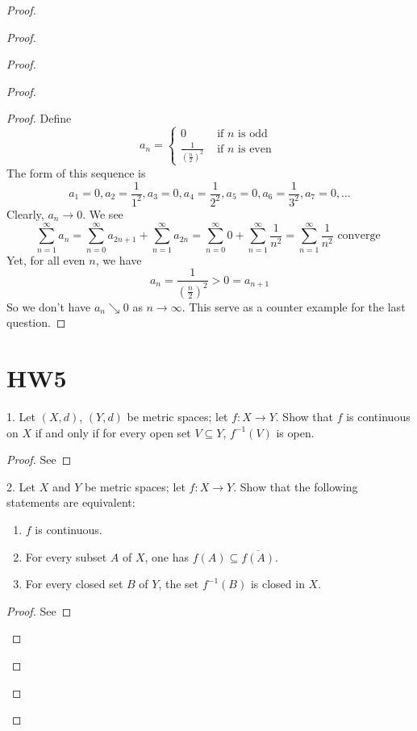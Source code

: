 \documentclass{report}
\begin{document}
\begin{proof}
\begin{proof}
\begin{proof}
\begin{proof}
\begin{proof}
Define
\begin{equation*}
a_n=\begin{cases}
 0& \text{ if $n$ is odd }\\
 \frac{1}{(\frac{n}{2})^2}& \text{ if $n$ is even }
\end{cases}
\end{equation*}
The form of this sequence is
\begin{equation*}
a_1=0,a_2=\frac{1}{1^2},a_3=0,a_4=\frac{1}{2^2},a_5=0,a_6=\frac{1}{3^2},a_7=0,\dots 
\end{equation*}
Clearly, $a_n\to 0$. We see
\begin{equation*}
\sum_{n=1}^\infty a_n=\sum_{n=0}^\infty a_{2n+1}+\sum_{n=1}^\infty a_{2n}=\sum_{n=0}^\infty 0+\sum_{n=1}^\infty \frac{1}{n^2}=\sum_{n=1}^\infty \frac{1}{n^2}\text{ converge }
\end{equation*}
Yet, for all even  $n$, we have
 \begin{equation*}
a_n=\frac{1}{(\frac{n}{2})^2}>0=a_{n+1}
\end{equation*}
So we don't have $a_n\searrow 0$ as  $n\to\infty$. This serve as a counter example for the last question.
\end{proof}
\section{HW5}

\begin{question}{}{}
1. Let \((X, d)\), \((Y, d)\) be metric spaces; let \(f : X \rightarrow Y\). Show that \(f\) is continuous on \(X\) if and
only if for every open set \(V\subseteq Y\), \(f^{-1}(V)\) is open.
\end{question}
\begin{proof}
See 
\end{proof}

\begin{question}{}{}

2. Let \(X\) and \(Y\) be metric spaces; let \(f : X \rightarrow Y\). Show that the following statements are
equivalent:

\begin{enumerate}
    \item \(f\) is continuous.
    \item For every subset \(A\) of \(X\), one has \(f(A) \subseteq \overline{f(A)}\).
    \item For every closed set \(B\) of \(Y\), the set \(f^{-1}(B)\) is closed in \(X\).
\end{enumerate}
\end{question}
\begin{proof}
See 
\end{proof}


\end{proof}
\end{proof}
\end{proof}
\end{proof}
\end{document}
